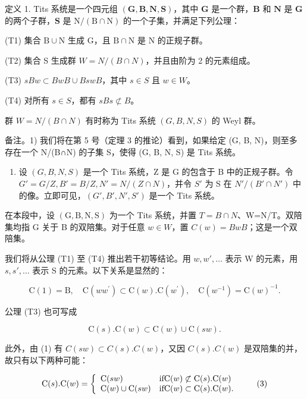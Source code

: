 定义 1. Tits 系统是一个四元组 \((\mathbf{G},\mathbf{B},\mathbf{N},\mathbf{S})\)，其中 \(\mathbf{G}\) 是一个群，\(\mathbf{B}\) 和 \(\mathbf{N}\) 是 \(\mathbf{G}\) 的两个子群，\(\mathbf{S}\) 是 \(\mathrm{N} / (\mathrm{B}\cap \mathrm{N})\) 的一个子集，并满足下列公理：

(T1) 集合 \(\mathrm{B} \cup \mathrm{N}\) 生成 \(\mathrm{G}\)，且 \(\mathrm{B} \cap \mathrm{N}\) 是 \(\mathrm{N}\) 的正规子群。

(T2) 集合 S 生成群 \(W = N/(B \cap N)\)，并且由阶为 2 的元素组成。

(T3) \(sBw \subset BwB \cup BswB\)，其中 \(s \in S\) 且 \(w \in W\)。

(T4) 对所有 \(s \in S\)，都有 \(sBs \not\subset B\)。

群 \(W = N / (B \cap N)\) 有时称为 Tits 系统 \((G, B, N, S)\) 的 Weyl 群。

备注。1) 我们将在第 5 号（定理 3 的推论）看到，如果给定 (G, B, N)，则至多存在一个 N/(B∩N) 的子集 S，使得 (G, B, N, S) 是 Tits 系统。

\begin{enumerate}
\def\labelenumi{\arabic{enumi})}
\setcounter{enumi}{1}
\tightlist
\item
  设 \((G, B, N, S)\) 是一个 Tits 系统，Z 是 G 的包含于 B 中的正规子群。令 \(G' = G/Z, B' = B/Z, N' = N/(Z \cap N)\)，并令 \(S'\) 为 S 在 \(N'/(B' \cap N')\) 中的像。立即可见，\((G', B', N', S')\) 是一个 Tits 系统。
\end{enumerate}

在本段中，设 \((\mathrm{G},\mathrm{B},\mathrm{N},\mathrm{S})\) 为一个 Tits 系统，并置 \(T=B\cap N\)、W=N/T。双陪集均指 G 关于 B 的双陪集。对于任意 \(w\in W\)，置 \(C(w)=BwB\)；这是一个双陪集。

我们将从公理 (T1) 至 (T4) 推出若干初等结论。用 \(w, w', \ldots\) 表示 W 的元素，用 \(s, s', \ldots\) 表示 S 的元素。以下关系是显然的：

\[
\mathrm{C} (1) = \mathrm{B}, \quad \mathrm{C} (w w ^ {\prime}) \subset \mathrm{C} (w). \mathrm{C} (w ^ {\prime}), \quad \mathrm{C} (w ^ {- 1}) = \mathrm{C} (w) ^ {- 1}.\tag{1}
\]

公理 (T3) 也可写成

\[
\mathrm{C} (s). \mathrm{C} (w) \subset \mathrm{C} (w) \cup \mathrm{C} (s w).\tag{2}
\]

此外，由 (1) 有 \(C(sw) \subset C(s).C(w)\)，又因 \(C(s).C(w)\) 是双陪集的并，故只有以下两种可能：

\[
\mathrm{C} (s). \mathrm{C} (w) = \left\{ \begin{array}{l l} \mathrm{C} (s w) & \text {if} \mathrm{C} (w) \not \subset \mathrm{C} (s). \mathrm{C} (w) \\ \mathrm{C} (w) \cup \mathrm{C} (s w) & \text {if} \mathrm{C} (w) \subset \mathrm{C} (s). \mathrm{C} (w). \end{array} \right.\tag{3}
\]

